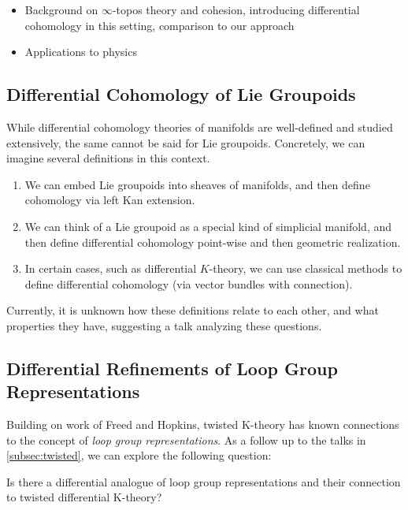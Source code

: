 \documentclass[10pt]{amsart}
\begin{document}
\begin{itemize}
  \item Background on $\infty$-topos theory and cohesion, introducing differential cohomology in this setting, comparison to our approach \cite{lurie2009htt,schreiber2013differentialcohomology}
  \item Applications to physics \cite{fiorenzasatischreiber2024charactermap}
\end{itemize}

\subsection{Differential Cohomology of Lie Groupoids} \label{subsec:liegroupoids}
While differential cohomology theories of manifolds are well-defined and studied extensively, the same cannot be said for Lie groupoids. Concretely, we can imagine several definitions in this context.

\begin{enumerate}
  \item We can embed Lie groupoids into sheaves of manifolds, and then define cohomology via left Kan extension. 
  \item We can think of a Lie groupoid as a special kind of simplicial manifold, and then define differential cohomology point-wise and then geometric realization.
  \item In certain cases, such as differential $K$-theory, we can use classical methods to define differential cohomology (via vector bundles with connection).
\end{enumerate}

Currently, it is unknown how these definitions relate to each other, and what properties they have, suggesting a talk analyzing these questions.

\subsection{Differential Refinements of Loop Group Representations} \label{subsec:loopgroup}
Building on work of Freed and Hopkins, twisted K-theory has known connections to the concept of \emph{loop group representations}.  As a follow up to the talks in \cref{subsec:twisted}, we can explore the following question:

\begin{question}
 Is there a differential analogue of loop group representations and their connection to twisted differential K-theory?
\end{question}
\end{document}
